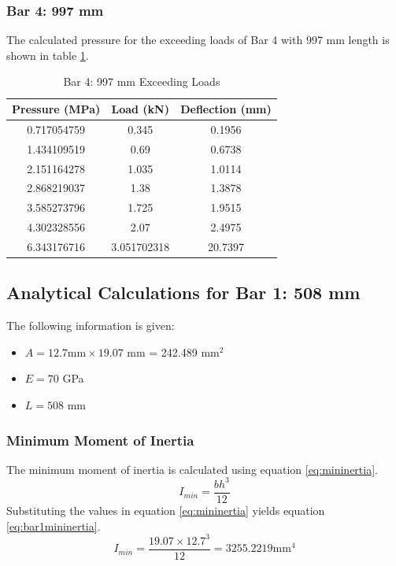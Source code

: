 \documentclass[12pt, titlepage]{article}
\begin{document}
\subsubsection{Bar 4: 997 mm}
The calculated pressure for the exceeding loads of Bar 4 with 997 mm length
is shown in table \ref{tab:bar4exceed}.
\begin{table}[H]
    \centering
    \caption{Bar 4: 997 mm Exceeding Loads}
    \label{tab:bar4exceed}
    \begin{tabular}{|c|c|c|}
        \hline
        \textbf{Pressure (MPa)} & \textbf{Load (kN)} & \textbf{Deflection (mm)}\\
        \hline
        0.717054759 & 0.345 & 0.1956 \\
        \hline
        1.434109519 & 0.69 & 0.6738 \\
        \hline
        2.151164278 & 1.035 & 1.0114 \\
        \hline
        2.868219037 & 1.38 & 1.3878 \\
        \hline
        3.585273796 & 1.725 & 1.9515 \\
        \hline
        4.302328556 & 2.07 & 2.4975 \\
        \hline
        6.343176716 & 3.051702318 & 20.7397 \\
        \hline
    \end{tabular}
\end{table}
\subsection{Analytical Calculations for Bar 1: 508 mm}
The following information is given:
\begin{itemize}
    \item $A = 12.7 \mathrm{mm} \times 19.07$ mm = 242.489 mm$^2$
    \item $E = 70$ GPa
    \item $L = 508$ mm
\end{itemize}
\subsubsection{Minimum Moment of Inertia}
The minimum moment of inertia is calculated using equation \ref{eq:mininertia}.
\begin{equation}
    \label{eq:mininertia}
    I_{min} = \frac{bh^3}{12}
\end{equation}
Substituting the values in equation \ref{eq:mininertia} yields equation
\ref{eq:bar1mininertia}.
\begin{equation}
    \label{eq:bar1mininertia}
    I_{min} = \frac{19.07 \times 12.7^3}{12} = 3255.2219 \mathrm{mm}^4
\end{equation}
\end{document}
